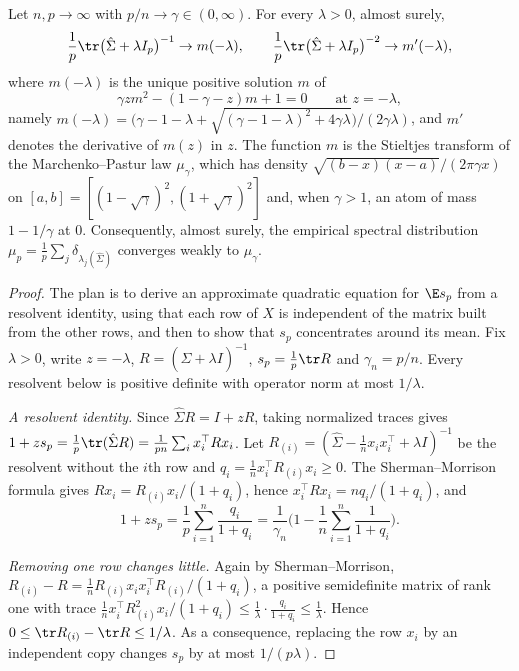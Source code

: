 \begin{refsection}
\begin{theorem}\label{thm:toolkit:mp}
Let $n,p\to\infty$ with $p/n\to\gamma\in(0,\infty)$. For every $\lambda>0$, almost surely,
\[
  \frac1p\tr\big(\hat\Sigma+\lambda I_p\big)^{-1}\to m(-\lambda),\qquad \frac1p\tr\big(\hat\Sigma+\lambda I_p\big)^{-2}\to m'(-\lambda),
\]
where $m(-\lambda)$ is the unique positive solution $m$ of
\begin{equation}\label{eq:toolkit:mp}
  \gamma zm^2-(1-\gamma-z)m+1=0\qquad\text{at }z=-\lambda,
\end{equation}
namely $m(-\lambda)=\big(\gamma-1-\lambda+\sqrt{(\gamma-1-\lambda)^2+4\gamma\lambda}\big)/(2\gamma\lambda)$, and $m'$ denotes the derivative of $m(z)$ in $z$. The function $m$ is the Stieltjes transform of the Marchenko--Pastur law $\mu_\gamma$, which has density $\sqrt{(b-x)(x-a)}/(2\pi\gamma x)$ on $[a,b]=[(1-\sqrt\gamma)^2,(1+\sqrt\gamma)^2]$ and, when $\gamma>1$, an atom of mass $1-1/\gamma$ at $0$. Consequently, almost surely, the empirical spectral distribution $\mu_p=\frac1p\sum_{j}\delta_{\lambda_j(\hat\Sigma)}$ converges weakly to $\mu_\gamma$.
\end{theorem}

\begin{proof}
The plan is to derive an approximate quadratic equation for $\E s_p$ from a resolvent identity, using that each row of $X$ is independent of the matrix built from the other rows, and then to show that $s_p$ concentrates around its mean. Fix $\lambda>0$, write $z=-\lambda$, $R=(\hat\Sigma+\lambda I)^{-1}$, $s_p=\frac1p\tr R$ and $\gamma_n=p/n$. Every resolvent below is positive definite with operator norm at most $1/\lambda$.

\emph{A resolvent identity.} Since $\hat\Sigma R=I+zR$, taking normalized traces gives $1+zs_p=\frac1p\tr(\hat\Sigma R)=\frac1{pn}\sum_ix_i^\top Rx_i$. Let $R_{(i)}=(\hat\Sigma-\frac1nx_ix_i^\top+\lambda I)^{-1}$ be the resolvent without the $i$th row and $q_i=\frac1nx_i^\top R_{(i)}x_i\ge0$. The Sherman--Morrison formula gives $Rx_i=R_{(i)}x_i/(1+q_i)$, hence $x_i^\top Rx_i=nq_i/(1+q_i)$, and
\begin{equation}\label{eq:toolkit:resolvent}
  1+zs_p=\frac1p\sum_{i=1}^n\frac{q_i}{1+q_i}=\frac1{\gamma_n}\Big(1-\frac1n\sum_{i=1}^n\frac1{1+q_i}\Big).
\end{equation}

\emph{Removing one row changes little.} Again by Sherman--Morrison, $R_{(i)}-R=\frac1nR_{(i)}x_ix_i^\top R_{(i)}/(1+q_i)$, a positive semidefinite matrix of rank one with trace $\frac1nx_i^\top R_{(i)}^2x_i/(1+q_i)\le\frac1\lambda\cdot\frac{q_i}{1+q_i}\le\frac1\lambda$. Hence $0\le\tr R_{(i)}-\tr R\le1/\lambda$. As a consequence, replacing the row $x_i$ by an independent copy changes $s_p$ by at most $1/(p\lambda)$.


\end{proof}
\end{refsection}
